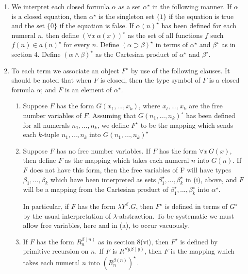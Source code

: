 \documentclass[12pt]{article}
\def\l{\lambda}
\def\limp{\supset}
\def\a{\alpha}
\def\b{\beta}
\def\rbnn{R_n^{\b(n)}}
\begin{document}
\begin{enumerate}[label=(\roman*)]

\item We interpret each closed formula $\a$ as a set $\a^\star$ in the following manner. If $\a$
is a closed equation, then $\a^\star$ is the singleton set $\{1\}$ if the equation is true and
the set $\{0\}$ if the equation is false. If $\a(n)^\star$ has been defined for each numeral $n$,
then define $(\forall x\, \a(x))^\star$ as the set of all functions $f$ such $f(n) \in a(n)^\star$ for every $n$.
Define $(\a\limp \b)^\star$ in terms of $\a^\star$ and $\b^\star$ as in section 4. Define $(\a \land \b)^\star$ as the Cartesian
product of $\a^\star$ and $\b^\star$.

\item To each term we associate an object $F^\star$ by use of the following clauses. It
should be noted that when $F$ is closed, then the type symbol of $F$ is a closed
formula $\a$; and $F$ is an element of $\a^\star$.

\begin{enumerate}

\item Suppose $F$ has the form $G(x_1, ... ,x_k)$, where $x_l, ... , x_k$ are the free number
variables of $F$. Assuming that $G(n_1, ... , n_k)^\star$ has been defined for all numerals 
$n_1, ... , n_k$, we define $F^\star$ to be the mapping which sends each $k$-tuple $n_1, ... , n_k$ into
$G(n_1, ... , n_k)^\star$

\item Suppose $F$ has no free number variables. If $F$ has the form $\forall x\, G(x)$, then
define $F$ as the mapping which takes each numeral $n$ into $G(n)$. If $F$ does not
have this form, then the free variables of F will have types $\b_1, ... ,\b_k$ which have
been interpreted as sets $\b_1^\star,...,\b_k^\star$ in (i), above, and $F$ will be a mapping from
the Cartesian product of $\b_1^\star,...,\b_k^\star$ into $\a^\star$.%
\medskip

In particular, if $F$ has the form $\l Y^\b .G$, then $F^\star$ is defined in terms of $G^\star$ by the usual interpretation of $\l$-abstraction. To be systematic we must allow free variables, here and in (a), to occur vacuously.

\item If $F$ has the form $\rbnn$ as in section 8(vi), then $F^\star$ is defined by primitive recursion
on $n$. If $F$ is $R^{\forall y \, \b(y)}$, then $F$ is the mapping which takes each numeral $n$ into $(\rbnn)^\star$.

\end{enumerate}

\end{enumerate}
\end{document}
